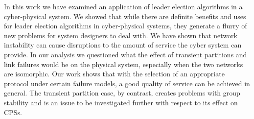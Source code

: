 In this work we have examined an application of leader election algorithms in a cyber-physical system. We showed that while there are definite benefits and uses for leader election algorithms in cyber-physical systems, they generate a flurry of new problems for system designers to deal with. We have shown that network instability can cause disruptions to the amount of service the cyber system can provide. In our analysis we questioned what the effect of transient partitions and link failures would be on the physical system, especially when the two networks are isomorphic. Our work shows that with the selection of an appropriate protocol under certain failure models, a good quality of service can be achieved in general. The transient partition case, by contrast, creates problems with group stability and is an issue to be investigated further with respect to its effect on CPSs.
